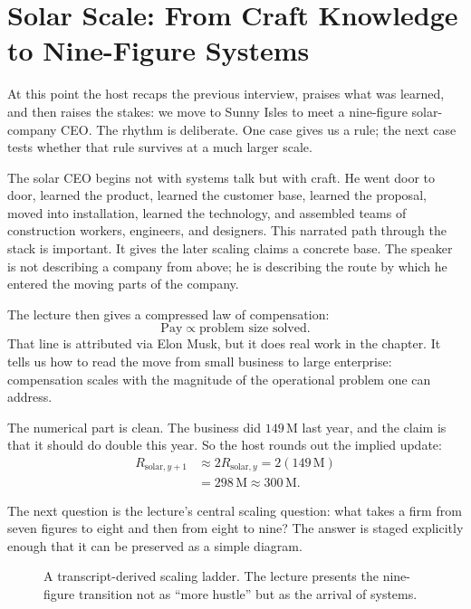 \section{Solar Scale: From Craft Knowledge to Nine-Figure Systems}

At this point the host recaps the previous interview, praises what was learned, and then raises the stakes: we move to Sunny Isles to meet a nine-figure solar-company CEO. The rhythm is deliberate. One case gives us a rule; the next case tests whether that rule survives at a much larger scale.

The solar CEO begins not with systems talk but with craft. He went door to door, learned the product, learned the customer base, learned the proposal, moved into installation, learned the technology, and assembled teams of construction workers, engineers, and designers. This narrated path through the stack is important. It gives the later scaling claims a concrete base. The speaker is not describing a company from above; he is describing the route by which he entered the moving parts of the company.

The lecture then gives a compressed law of compensation:
\begin{equation}
\text{Pay} \propto \text{problem size solved}.
\end{equation}
That line is attributed via Elon Musk, but it does real work in the chapter. It tells us how to read the move from small business to large enterprise: compensation scales with the magnitude of the operational problem one can address.

The numerical part is clean. The business did \(149\,\mathrm{M}\) last year, and the claim is that it should do double this year. So the host rounds out the implied update:
\begin{align}
R_{\text{solar},y+1}
&\approx 2R_{\text{solar},y}
=2(149\,\mathrm{M}) \\
&= 298\,\mathrm{M}
\approx 300\,\mathrm{M}.
\end{align}

The next question is the lecture's central scaling question: what takes a firm from seven figures to eight and then from eight to nine? The answer is staged explicitly enough that it can be preserved as a simple diagram.

\begin{figure}[h]
\centering
{}
\caption{A transcript-derived scaling ladder. The lecture presents the nine-figure transition not as ``more hustle'' but as the arrival of systems.}
\end{figure}

